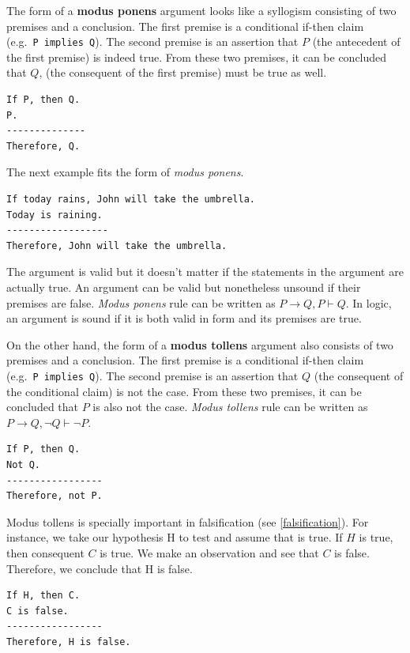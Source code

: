 \documentclass[
]{book}
\begin{document}
The form of a \textbf{modus ponens} argument looks like a syllogism consisting of two premises and a conclusion. The first premise is a conditional if-then claim (e.g.~\texttt{P\ implies\ Q}). The second premise is an assertion that \(P\) (the antecedent of the first premise) is indeed true. From these two premises, it can be concluded that \(Q\), (the consequent of the first premise) must be true as well.

\begin{verbatim}
If P, then Q.
P.
--------------
Therefore, Q.
\end{verbatim}

The next example fits the form of \emph{modus ponens}.

\begin{verbatim}
If today rains, John will take the umbrella.
Today is raining.
------------------
Therefore, John will take the umbrella.
\end{verbatim}

The argument is valid but it doesn't matter if the statements in the argument are actually true. An argument can be valid but nonetheless unsound if their premises are false. \emph{Modus ponens} rule can be written as \(P \rightarrow Q, P \vdash Q\). In logic, an argument is sound if it is both valid in form and its premises are true.

On the other hand, the form of a \textbf{modus tollens} argument also consists of two premises and a conclusion. The first premise is a conditional if-then claim (e.g.~\texttt{P\ implies\ Q}). The second premise is an assertion that \(Q\) (the consequent of the conditional claim) is not the case. From these two premises, it can be concluded that \(P\) is also not the case. \emph{Modus tollens} rule can be written as \(P \rightarrow Q, \lnot Q \vdash \lnot P\).

\begin{verbatim}
If P, then Q.
Not Q.
-----------------
Therefore, not P.
\end{verbatim}

Modus tollens is specially important in falsification (see \ref{falsification}). For instance, we take our hypothesis H to test and assume that is true. If \(H\) is true, then consequent \(C\) is true. We make an observation and see that \(C\) is false. Therefore, we conclude that H is false.

\begin{verbatim}
If H, then C.
C is false.
-----------------
Therefore, H is false.
\end{verbatim}
\end{document}
